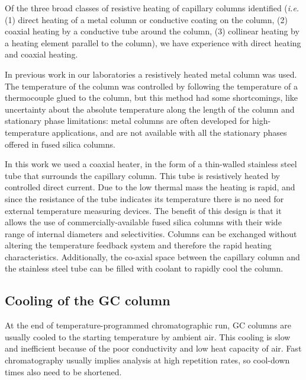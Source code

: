 \documentclass[aip,rsi,preprint,graphicx]{revtex4-1} %
\begin{document}


Of the three broad classes of resistive heating of capillary columns
identified\cite{Wang2012} (\textit{i.e.} (1) direct heating of a metal column or
conductive coating on the column, (2) coaxial heating by a conductive tube
around the column, (3) collinear heating by a heating element parallel to the
column), we have experience with direct heating and coaxial heating.

In previous work in our laboratories\cite*{Venter2004, Venter2006} a resistively
heated metal column was used. The temperature of the column was controlled by
following the temperature of a thermocouple glued to the column, but this method
had some shortcomings, like uncertainty about the absolute temperature along the
length of the column and stationary phase limitations: metal columns are often
developed for high-temperature applications, and are not available with
all the stationary phases offered in fused silica columns.


In this work we used a coaxial heater, in the form of a thin-walled stainless
steel tube that surrounds the capillary column.  This tube is resistively heated
by controlled direct current. Due to the low thermal mass the heating is rapid,
and since the resistance of the tube indicates its temperature there is no need
for external temperature measuring devices. The benefit of this design is that
it allows the use of commercially-available fused silica columns with their wide
range of internal diameters and selectivities. Columns can be exchanged without
altering the temperature feedback system and therefore the rapid heating
characteristics. Additionally, the co-axial space between the capillary column
and the stainless steel tube can be filled with coolant to rapidly cool the
column.

\subsection{Cooling of the GC column}

At the end of temperature-programmed chromatographic run, GC columns are usually
cooled to the starting temperature by ambient air. This cooling is slow and
inefficient because of the poor conductivity and low heat capacity of air. Fast
chromatography usually implies analysis at high repetition rates, so cool-down
times also need to be shortened. 
\end{document}
